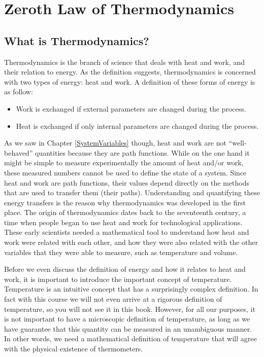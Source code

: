 \documentclass[
]{book}
\providecommand{\tightlist}{%
  \setlength{\itemsep}{0pt}\setlength{\parskip}{0pt}}
\theoremstyle{definition}
\theoremstyle{definition}
\theoremstyle{definition}
\theoremstyle{remark}
\begin{document}
\hypertarget{ZerothLaw}{%
\chapter{Zeroth Law of Thermodynamics}\label{ZerothLaw}}

\hypertarget{what-is-thermodynamics}{%
\section{What is Thermodynamics?}\label{what-is-thermodynamics}}

Thermodynamics is the branch of science that deals with heat and work, and their relation to energy. As the definition suggests, thermodynamics is concerned with two types of energy: heat and work. A definition of these forms of energy is as follow:

\begin{itemize}
\tightlist
\item
  Work is exchanged if external parameters are changed during the process.
\item
  Heat is exchanged if only internal parameters are changed during the process.
\end{itemize}

As we saw in Chapter \ref{SystemVariables} though, heat and work are not ``well-behaved'' quantities because they are path functions. While on the one hand it might be simple to measure experimentally the amount of heat and/or work, these measured numbers cannot be used to define the state of a system. Since heat and work are path functions, their values depend directly on the methods that are used to transfer them (their paths). Understanding and quantifying these energy transfers is the reason why thermodynamics was developed in the first place. The origin of thermodynamics dates back to the seventeenth century, a time when people began to use heat and work for technological applications. These early scientists needed a mathematical tool to understand how heat and work were related with each other, and how they were also related with the other variables that they were able to measure, such as temperature and volume.

Before we even discuss the definition of energy and how it relates to heat and work, it is important to introduce the important concept of temperature. Temperature is an intuitive concept that has a surprisingly complex definition. In fact with this course we will not even arrive at a rigorous definition of temperature, so you will not see it in this book. However, for all our purposes, it is not important to have a microscopic definition of temperature, as long as we have guarantee that this quantity can be measured in an unambiguous manner. In other words, we need a mathematical definition of temperature that will agree with the physical existence of thermometers.
\end{document}
